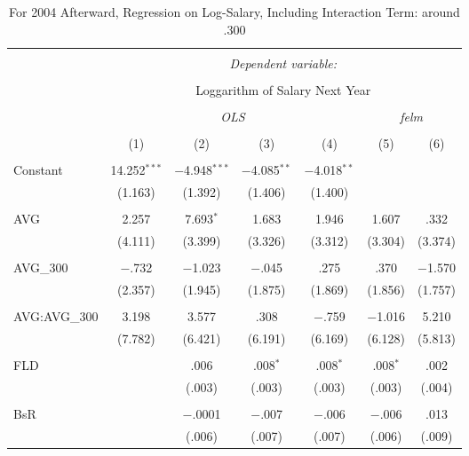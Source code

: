 
\begin{table}[H] \centering
  \caption{For 2004 Afterward, Regression on Log-Salary, Including Interaction Term: around .300}
  \label{AVG300_D}
\tiny
\begin{tabular}{@{\extracolsep{5pt}}lcccccc}
\\[-1.8ex]\hline
\hline \\[-1.8ex]
 & \multicolumn{6}{c}{\textit{Dependent variable:}} \\
\cline{2-7}
\\[-1.8ex] & \multicolumn{6}{c}{Loggarithm of Salary Next Year} \\
\\[-1.8ex] & \multicolumn{4}{c}{\textit{OLS}} & \multicolumn{2}{c}{\textit{felm}} \\
\\[-1.8ex] & (1) & (2) & (3) & (4) & (5) & (6)\\
\hline \\[-1.8ex]
 Constant & 14.252$^{***}$ & $-$4.948$^{***}$ & $-$4.085$^{**}$ & $-$4.018$^{**}$ &  &  \\
  & (1.163) & (1.392) & (1.406) & (1.400) &  &  \\
  & & & & & & \\
 AVG & 2.257 & 7.693$^{*}$ & 1.683 & 1.946 & 1.607 & .332 \\
  & (4.111) & (3.399) & (3.326) & (3.312) & (3.304) & (3.374) \\
  & & & & & & \\
 AVG\_300 & $-$.732 & $-$1.023 & $-$.045 & .275 & .370 & $-$1.570 \\
  & (2.357) & (1.945) & (1.875) & (1.869) & (1.856) & (1.757) \\
  & & & & & & \\
  AVG:AVG\_300 & 3.198 & 3.577 & .308 & $-$.759 & $-$1.016 & 5.210 \\
  & (7.782) & (6.421) & (6.191) & (6.169) & (6.128) & (5.813) \\
  & & & & & & \\
 FLD &  & .006 & .008$^{*}$ & .008$^{*}$ & .008$^{*}$ & .002 \\
  &  & (.003) & (.003) & (.003) & (.003) & (.004) \\
  & & & & & & \\
 BsR &  & $-$.0001 & $-$.007 & $-$.006 & $-$.006 & .013 \\
  &  & (.006) & (.007) & (.007) & (.006) & (.009) \\

\end{tabular}
\end{table}

